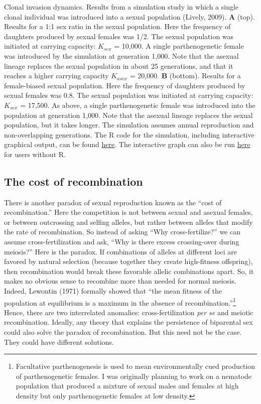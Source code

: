 \documentclass[
  letterpaper,
]{book}
\begin{document}
{\label{fig-1-2}Clonal invasion dynamics. Results from a simulation study
in which a single clonal individual was introduced into a sexual
population (Lively, 2009). \textbf{A} (top). Results for a 1:1 sex ratio
in the sexual population. Here the frequency of daughters produced by
sexual females was 1/2. The sexual population was initiated at carrying
capacity: \(K_{sex}\) = 10,000. A single parthenogenetic female was
introduced by the simulation at generation 1,000. Note that the asexual
lineage replaces the sexual population in about 25 generations, and that
it reaches a higher carrying capacity \(K_{asex}\) = 20,000. \textbf{B}
(bottom). Results for a female-biased sexual population. Here the
frequency of daughters produced by sexual females was 0.8. The sexual
population was initiated at carrying capacity: \(K_{sex}\) = 17,500. As
above, a single parthenogenetic female was introduced into the
population at generation 1,000. Note that the asexual lineage replaces
the sexual population, but it takes longer. The simulation assumes
annual reproduction and non-overlapping generations. The R code for the
simulation, including interactive graphical output, can be found
\href{https://raw.githubusercontent.com/IULibScholComm/through-the-looking-glass/main/sim\%20for\%20fig\%201.2(ZMD).R}{here}.
The interactive graph can also be run
\href{https://connect.posit.iu.edu/clonal-invasion-dynamics/}{here} for
users without R.

}

\hypertarget{the-cost-of-recombination}{%
\subsection{The cost of recombination}\label{the-cost-of-recombination}}

There is another paradox of sexual reproduction known as the ``cost of
recombination.'' Here the competition is not between sexual and asexual
females, or between outcrossing and selfing alleles, but rather between
alleles that modify the rate of recombination. So instead of asking
``Why cross-fertilize?'' we can assume cross-fertilization and ask,
``Why is there excess crossing-over during meiosis?'' Here is the
paradox. If combinations of alleles at different loci are favored by
natural selection (because together they create high-fitness offspring),
then recombination would break these favorable allelic combinations
apart. So, it makes no obvious sense to recombine more than needed for
normal meiosis. Indeed, Lewontin (1971) formally showed that ``the mean
fitness of the population at equilibrium is a maximum in the absence of
recombination.''\footnote{Facultative parthenogenesis is used to mean
  environmentally cued production of parthenogenetic females. I was
  originally planning to work on a nematode population that produced a
  mixture of sexual males and females at high density but only
  parthenogenetic females at low density.} Hence, there are two
interrelated anomalies: cross-fertilization \emph{per se} and meiotic
recombination. Ideally, any theory that explains the persistence of
biparental sex could also solve the paradox of recombination. But this
need not be the case. They could have different solutions.
\end{document}

